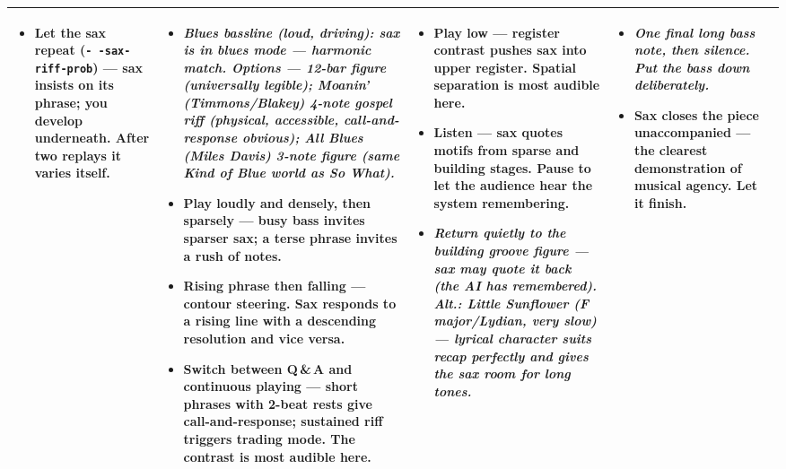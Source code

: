 \documentclass[9pt,a4paper,landscape]{article}
\newcommand{\musicue}[1]{{\small\textcolor{musicnote}{\textit{#1}}}}
\begin{document}
\begin{tabularx}{\linewidth}{@{}|X|X|X|X|X|@{}}
\begin{itemize}
  \item \textbf{Let the sax repeat} (\texttt{-\,-sax-riff-prob}) — sax insists on its phrase; you develop underneath. After two replays it varies itself.
\end{itemize}
&
\cellcolor{peakbg}
\begin{itemize}
  \item \musicue{Blues bassline (loud, driving): sax is in blues mode — harmonic match. Options — 12-bar figure (universally legible); \textit{Moanin'} (Timmons/Blakey) 4-note gospel riff (physical, accessible, call-and-response obvious); \textit{All Blues} (Miles Davis) 3-note figure (same \textit{Kind of Blue} world as \textit{So What}).}
  \item \textbf{Play loudly and densely, then sparsely} — busy bass invites sparser sax; a terse phrase invites a rush of notes.
  \item \textbf{Rising phrase then falling} — contour steering. Sax responds to a rising line with a descending resolution and vice versa.
  \item \textbf{Switch between Q\,\&\,A and continuous playing} — short phrases with 2-beat rests give call-and-response; sustained riff triggers trading mode. The contrast is most audible here.
\end{itemize}
&
\cellcolor{recapbg}
\begin{itemize}
  \item \textbf{Play low} — register contrast pushes sax into upper register. Spatial separation is most audible here.
  \item \textbf{Listen} — sax quotes motifs from sparse and building stages. Pause to let the audience hear the system remembering.
  \item \musicue{Return quietly to the building groove figure — sax may quote it back (the AI has remembered). Alt.: \textit{Little Sunflower} (F major/Lydian, very slow) — lyrical character suits recap perfectly and gives the sax room for long tones.}
\end{itemize}
&
\cellcolor{resolutionbg}
\begin{itemize}
  \item \musicue{One final long bass note, then silence. Put the bass down deliberately.}
  \item \textbf{Sax closes the piece unaccompanied} — the clearest demonstration of musical agency. Let it finish.
\end{itemize}
\\

\hline
\end{tabularx}
\end{document}
